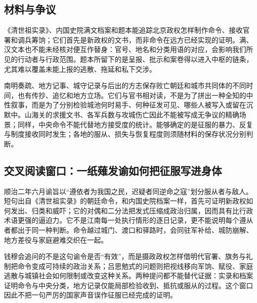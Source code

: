 \subsection{材料与争议}

《清世祖实录》、内国史院满文档案和题本能追踪北京政权怎样制作命令、接收官署和调兵筹饷；它们首先是新政权的文书，而非命令在远方已经实现的证明。满、汉文本也不能未经核对便互作替身：官号、地名和分类用语的对应，会影响我们所见的行动者与行政范围。题本所留下的是呈报、批示和案卷得以进入中枢的链条，尤其难以覆盖未能上报的逃散、拖延和私下交涉。

南明奏疏、地方记事、城守记录与后出的方志保存败亡朝廷和城市共同体的不同时间，也有传抄、追忆和地方立场。它们与官书相对读，不是为了拼出一种全知的中性叙事，而是为了分别检验城池何时易手、何种征发可见、哪些人被写入或留在沉默中。山海关的求援文书、各军兵数与攻城伤亡因此不能被写成无争议的精确场景；同样，中央命令不能代替地方接受度的统计。能够确定的是征服的暴力、反复与制度接收同时发生；各地的服从、损失与恢复程度则须随材料的保存状况分别判断。

\subsection{交叉阅读窗口：一纸薙发谕如何把征服写进身体}

顺治二年六月谕旨以“遵依者为我国之民，迟疑者同逆命之寇”划分服从者与敌人。短句出自《清世祖实录》的朝廷命令，和内国史院档案一样，首先可证明新政权如何发出、归类和威吓；它的对偶和二分法把发式压缩成政治归属，因而具有比行政术语更强的逼迫力。它不是江南每一处执行情形的逐日记录，更不能说明每个遵从者都出于同一种判断。命令越过城门、渡口和驿路时，会同驻军补给、城防崩解、地方差役与家庭避难交织在一起。

钱穆会追问的不是这句谕令是否“有效”，而是摄政政权怎样借明代官署、旗务与礼制把命令变成可持续的政治关系；吕思勉式的问题则把视线移向军饷、赋役、家庭逃散与城镇社会如何限制或改变这种关系。两种提问都不能替代证据：实录和档案证明命令与中央分类，地方记录仅能局部检验收到、抵抗或服从的过程。这个窗口因此不把一句严厉的国家声音误作征服已经完成的证明。
